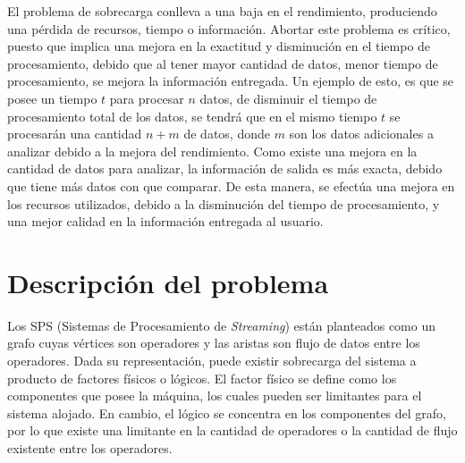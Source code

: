 El problema de sobrecarga conlleva a una baja en el rendimiento, produciendo una pérdida de recursos, tiempo o información. Abortar este problema es cr\'itico, puesto que implica una mejora en la exactitud y disminución en el tiempo de procesamiento, debido que al tener mayor cantidad de datos, menor tiempo de procesamiento, se mejora la información entregada. Un ejemplo de esto, es que se posee un tiempo $t$ para procesar $n$ datos, de disminuir el tiempo de procesamiento total de los datos, se tendrá que en el mismo tiempo $t$ se procesarán una cantidad $n+m$ de datos, donde $m$ son los datos adicionales a analizar debido a la mejora del rendimiento. Como existe una mejora en la cantidad de datos para analizar, la información de salida es más exacta, debido que tiene más datos con que comparar. De esta manera, se efectúa una mejora en los recursos utilizados, debido a la disminución del tiempo de procesamiento, y una mejor calidad en la información entregada al usuario.

\section{Descripción del problema}
\label{intro:problema}


Los SPS (Sistemas de Procesamiento de \textit{Streaming}) están planteados como un grafo cuyas vértices son operadores y las aristas son flujo de datos entre los operadores. Dada su representación, puede existir sobrecarga del sistema a producto de factores físicos o lógicos. El factor físico se define como los componentes que posee la máquina, los cuales pueden ser limitantes para el sistema alojado. En cambio, el lógico se concentra en los componentes del grafo, por lo que existe una limitante en la cantidad de operadores o la cantidad de flujo existente entre los operadores.


